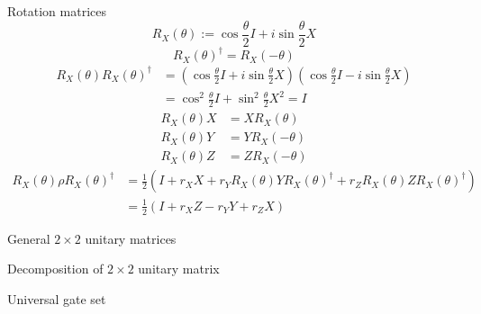\documentclass{beamer}
\begin{document}
\begin{frame}{Rotation matrices}
\begin{equation*}
R_X(\theta) := \cos\frac{\theta}2 I + i \sin\frac{\theta}2 X
\end{equation*}
\begin{equation*}
R_X(\theta)^\dagger = R_X(-\theta)
\end{equation*}
\begin{align*}
R_X(\theta)R_X(\theta)^\dagger &= (\cos\frac{\theta}2 I + i \sin\frac{\theta}2 X)(\cos\frac{\theta}2 I - i \sin\frac{\theta}2 X)\\
&= \cos^2\frac{\theta}2 I + \sin^2\frac{\theta}2 X^2=I
\end{align*}
\begin{align*}
R_X(\theta)X&=X R_X(\theta)\\
R_X(\theta)Y&=Y R_X(-\theta)\\
R_X(\theta)Z&=Z R_X(-\theta)
\end{align*}
\begin{align*}
R_X(\theta)\rho R_X(\theta)^\dagger &= \frac12\left(I + r_X X + r_Y R_X(\theta)YR_X(\theta)^\dagger + r_Z R_X(\theta)ZR_X(\theta)^\dagger\right)\\
&=  \frac12\left(I + r_X Z - r_Y Y + r_Z X\right)
\end{align*}
\end{frame}

\begin{frame}{General $2\times 2$ unitary matrices}
\end{frame}

\begin{frame}{Decomposition of $2\times 2$ unitary matrix}
\end{frame}

\begin{frame}{Universal gate set}
\end{frame}
\end{document}
